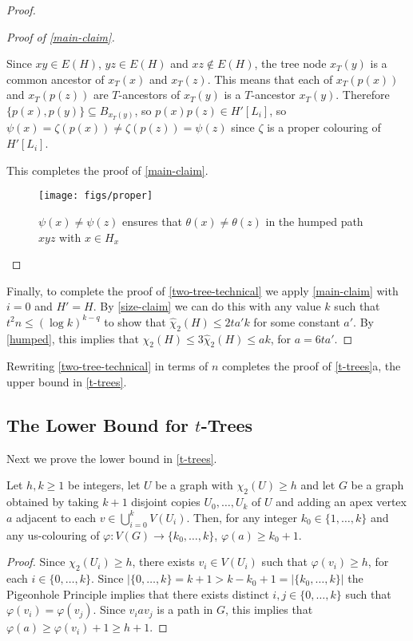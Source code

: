 \documentclass[kpfonts]{patmorin}
\newcommand{\uqs}{\chi_2}
\newcommand{\hus}{\hat{\chi}_2}
\theoremstyle{named}
\newcommand{\weirdref}[2]{\cref{#1}#2}
\begin{document}
\begin{proof}
\begin{proof}[Proof of \cref{main-claim}]
\begin{compactenum}
          Since $xy\in E(H)$, $yz\in E(H)$ and $xz\not\in E(H)$, the tree node
          $x_T(y)$ is a common ancestor of $x_T(x)$ and $x_T(z)$.  This means that each of $x_T(p(x))$ and $x_T(p(z))$ are $T$-ancestors of $x_T(y)$  is a $T$-ancestor $x_T(y)$. Therefore $\{p(x),p(y)\}\subseteq B_{x_T(y)}$, so $p(x)p(z)\in H'[L_i]$, so $\psi(x)=\zeta(p(x))\neq\zeta(p(z))=\psi(z)$ since $\zeta$ is a proper colouring of $H'[L_i]$.
      \end{compactenum}
      This completes the proof of \cref{main-claim}.
       \begin{figure}
           \begin{center}
            \texttt{[image: figs/proper]}
            \end{center}
           \caption{$\psi(x)\neq\psi(z)$ ensures that $\theta(x)\neq \theta(z)$ in the humped path $xyz$ with $x\in H_x$}
           \label{proper}
       \end{figure}
    \end{proof}
    Finally, to complete the proof of \cref{two-tree-technical} we apply \cref{main-claim} with $i=0$ and $H'=H$.  By \cref{size-claim} we can do this with any value $k$ such that $t^2n \le (\log k)^{k-q}$ to show that $\hus(H)\le 2ta'k$ for some constant $a'$.  By \cref{humped}, this implies that $\uqs(H)\le 3\hus(H)\le ak$, for $a=6ta'$.
\end{proof}

Rewriting \cref{two-tree-technical} in terms of $n$ completes the proof of \weirdref{t-trees}{a}, the upper bound in \cref{t-trees}.



\subsection{The Lower Bound for $t$-Trees}

Next we prove the lower bound in \cref{t-trees}.

\begin{lem}\label{apex-graph}
    Let $h,k\ge 1$ be integers, let $U$ be a graph with $\uqs(U)\ge h$ and let $G$ be a graph obtained by taking $k+1$ disjoint copies $U_0,\ldots,U_k$ of $U$ and adding an apex vertex $a$ adjacent to each $v\in\bigcup_{i=0}^k V(U_i)$.  Then, for any integer $k_0\in \{1,\ldots,k\}$ and any us-colouring of $\varphi:V(G)\to\{k_0,\ldots,k\}$, $\varphi(a) \ge k_0+1$.
\end{lem}

\begin{proof}
    Since $\uqs(U_i)\ge h$, there exists $v_i\in V(U_i)$ such that $\varphi(v_i)\ge h$, for each $i\in\{0,\ldots,k\}$.  Since $|\{0,\ldots,k\}=k+1>k-k_0+1=|\{k_0,\ldots,k\}|$ the Pigeonhole Principle implies that there exists distinct $i,j\in\{0,\ldots,k\}$ such that $\varphi(v_i)=\varphi(v_j)$.  Since $v_i a v_j$ is a path in $G$, this implies that $\varphi(a)\ge \varphi(v_i)+1\ge h+1$.
\end{proof}
\end{document}
